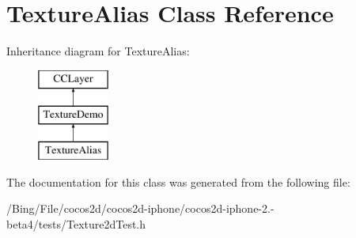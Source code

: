 \hypertarget{interface_texture_alias}{\section{Texture\-Alias Class Reference}
\label{interface_texture_alias}
}
Inheritance diagram for Texture\-Alias\-:\begin{figure}[H]
\begin{center}
\leavevmode
\includegraphics[height=3.000000cm]{interface_texture_alias}
\end{center}
\end{figure}


The documentation for this class was generated from the following file\-:\begin{DoxyCompactItemize}
\item 
/\-Bing/\-File/cocos2d/cocos2d-\/iphone/cocos2d-\/iphone-\/2.-\/beta4/tests/Texture2d\-Test.\-h\end{DoxyCompactItemize}
